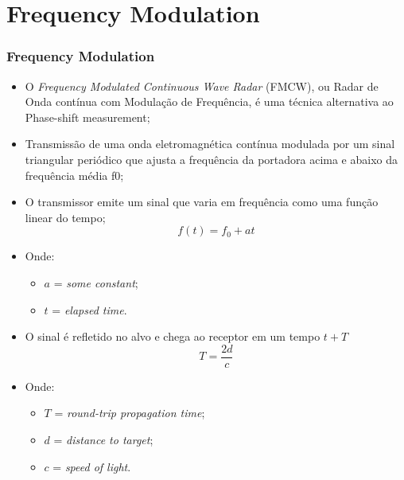 \documentclass[xcolor=dvipsnames, aspectratio=169]{beamer}
\begin{document}
\section[Introdução]{Frequency Modulation} 
\begin{frame}
\frametitle{Frequency Modulation}
	\begin{itemize}
		\item O \textit{Frequency Modulated Continuous Wave Radar} (FMCW), ou Radar de Onda contínua com Modulação de Frequência, é uma técnica alternativa ao Phase-shift measurement;
		\item Transmissão de uma onda eletromagnética contínua modulada por um sinal triangular periódico que ajusta a frequência da portadora acima e abaixo da frequência média f0;
		\item O transmissor emite um sinal que varia em frequência como uma função linear do tempo;
		\begin{equation}
            f(t) = f_0 + at
        \end{equation}
        \item Onde:
        \begin{itemize}
            \item[] $a$ = \textit{some constant};
            \item[] $t$ = \textit{elapsed time}.
        \end{itemize}
        \item O sinal é refletido no alvo e chega ao receptor em um tempo $t + T$
        \begin{equation}
            T = \frac{2d}{c}
        \end{equation}
        \item Onde:
        \begin{itemize}
            \item[] $T$ = \textit{round-trip propagation time};
            \item[] $d$ = \textit{distance to target};
            \item[] $c$ = \textit{speed of light}.
        \end{itemize}
        \begin{figure}
            \centering

\end{figure}
\end{itemize}
\end{frame}
\end{document}
